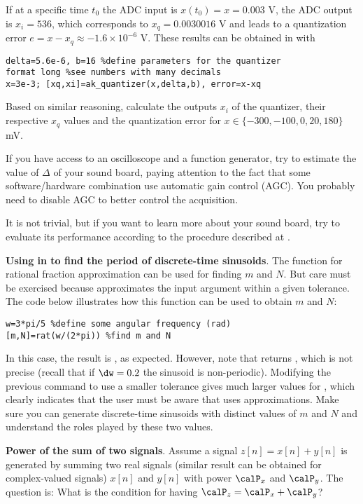 If at a specific time $t_0$ the ADC input is $x(t_0)=x=0.003$ V, the ADC output is $x_i=536$, which corresponds to $x_q=0.0030016$ V and leads to a quantization error $e=x-x_q \approx -1.6 \times 10^{-6}$ V. These results can be obtained in {\matlab} with
\begin{lstlisting}
delta=5.6e-6, b=16 %define parameters for the quantizer
format long %see numbers with many decimals
x=3e-3; [xq,xi]=ak_quantizer(x,delta,b), error=x-xq
\end{lstlisting}
Based on similar reasoning, calculate the outputs $x_i$ of the quantizer, their respective $x_q$ values and the quantization error for $x \in \{-300,-100,0,20,180\}$ mV.

If you have access to an oscilloscope and a function generator, try to estimate the value of $\Delta$ of your sound board, paying attention to the fact that some software/hardware combination use automatic gain control (AGC). You probably need to disable AGC to better control the acquisition.

It is not trivial, but if you want to learn more about your sound board, try to evaluate its performance according to the procedure described at .
\eApplication

\bApplication \textbf{Using  in {\matlab} to find the period of discrete-time sinusoids}.
\label{app:rat_in_matlab}
The {\matlab} function  for rational fraction approximation can be used for finding $m$ and $N$.  But care must be exercised because  approximates the input argument within a given tolerance. The code below illustrates how this function can be used to obtain $m$ and $N$:
\begin{lstlisting}
w=3*pi/5 %define some angular frequency (rad)
[m,N]=rat(w/(2*pi)) %find m and N
\end{lstlisting}
In this case, the result is , as expected. However, note that  returns , which is not precise (recall that if $\dw=0.2$ the sinusoid is non-periodic). Modifying the previous command to use a smaller tolerance  gives much larger values for , which clearly indicates that the user must be aware that  uses approximations.
Make sure you can generate discrete-time sinusoids with distinct values of $m$ and $N$ and understand the roles played by these two values.
\eApplication

\bApplication \textbf{Power of the sum of two signals}.
\label{app:power_of_sum_signals}
Assume a signal $z[n]=x[n]+y[n]$ is generated by summing two real signals (similar result can be obtained for complex-valued signals) $x[n]$ and $y[n]$ with power $\calP_x$ and $\calP_y$. The question is: What is the condition for having $\calP_z = \calP_x + \calP_y$?

